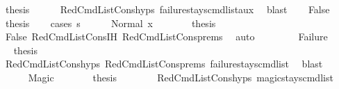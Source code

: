 \begin{isabellebody}
\ {\isacharquery}{\kern0pt}thesis\isanewline
\ \ \ \ \isamarkupfalse%
\ RedCmdListCons{\isachardot}{\kern0pt}hyps{\isacharparenleft}{\kern0pt}{}{\isacharparenright}{\kern0pt}\ failure{\isacharunderscore}{\kern0pt}stays{\isacharunderscore}{\kern0pt}cmd{\isacharunderscore}{\kern0pt}list{\isacharunderscore}{\kern0pt}aux\ \isamarkupfalse%
\ blast\isanewline
{}\isamarkupfalse%
\isanewline
\ \ \isamarkupfalse%
\ False\isanewline
\ \ \isamarkupfalse%
\ \isamarkupfalse%
\ {\isacharquery}{\kern0pt}thesis\isanewline
\ \ \isamarkupfalse%
\ {\isacharparenleft}{\kern0pt}cases\ {\isachardoublequoteopen}s{\isacharprime}{\kern0pt}{\isacharprime}{\kern0pt}{\isachardoublequoteclose}{\isacharparenright}{\kern0pt}\isanewline
\ \ \ \ \isamarkupfalse%
\ {\isacharparenleft}{\kern0pt}Normal\ x{}{\isacharparenright}{\kern0pt}\isanewline
\ \ \ \ \isamarkupfalse%
\ \isamarkupfalse%
\ {\isacharquery}{\kern0pt}thesis\isanewline
\ \ \ \ \ \ \isamarkupfalse%
\ False\ RedCmdListCons{\isachardot}{\kern0pt}IH\ RedCmdListCons{\isachardot}{\kern0pt}prems{\isacharparenleft}{\kern0pt}{}{\isacharparenright}{\kern0pt}\ \isamarkupfalse%
\ auto\isanewline
\ \ \isamarkupfalse%
\isanewline
\ \ \ \ \isamarkupfalse%
\ Failure\isanewline
\ \ \ \ \isamarkupfalse%
\ \isamarkupfalse%
\ {\isacharquery}{\kern0pt}thesis\isanewline
\ \ \ \ \ \ \isamarkupfalse%
\ RedCmdListCons{\isachardot}{\kern0pt}hyps{\isacharparenleft}{\kern0pt}{}{\isacharparenright}{\kern0pt}\ RedCmdListCons{\isachardot}{\kern0pt}prems{\isacharparenleft}{\kern0pt}{}{\isacharparenright}{\kern0pt}\ failure{\isacharunderscore}{\kern0pt}stays{\isacharunderscore}{\kern0pt}cmd{\isacharunderscore}{\kern0pt}list\ \isamarkupfalse%
\ blast\isanewline
\ \ \isamarkupfalse%
\isanewline
\ \ \ \ \isamarkupfalse%
\ Magic\isanewline
\ \ \ \ \isamarkupfalse%
\ \isamarkupfalse%
\ {\isacharquery}{\kern0pt}thesis\isanewline
\ \ \ \ \ \ \isamarkupfalse%
\ RedCmdListCons{\isachardot}{\kern0pt}hyps{\isacharparenleft}{\kern0pt}{}{\isacharparenright}{\kern0pt}\ magic{\isacharunderscore}{\kern0pt}stays{\isacharunderscore}{\kern0pt}cmd{\isacharunderscore}{\kern0pt}list{\isacharunderscore}{\kern0pt}{}\ \isamarkupfalse%

\end{isabellebody}
